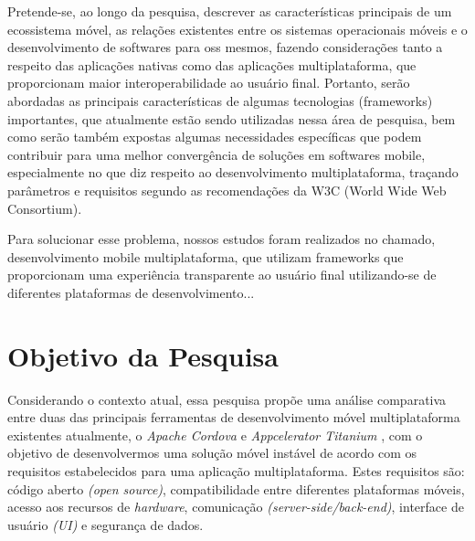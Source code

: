 Pretende-se, ao longo da pesquisa, descrever as características principais de um ecossistema móvel, as
relações existentes entre os sistemas operacionais móveis e o desenvolvimento de softwares para oss
mesmos, fazendo considerações tanto a respeito das aplicações nativas como das aplicações
multiplataforma, que proporcionam maior interoperabilidade ao usuário final. Portanto, serão abordadas as
principais características de algumas tecnologias (frameworks) importantes, que atualmente estão sendo
utilizadas nessa área de pesquisa, bem como serão também expostas algumas necessidades específicas que
podem contribuir para uma melhor convergência de soluções em softwares mobile, especialmente no que diz
respeito ao desenvolvimento multiplataforma, traçando parâmetros e requisitos segundo as recomendações
da W3C (World Wide Web Consortium).

Para solucionar esse problema, nossos estudos foram realizados no
chamado, desenvolvimento mobile multiplataforma, que utilizam frameworks que
proporcionam uma experiência transparente ao usuário final utilizando-se de
diferentes plataformas de desenvolvimento...


\section{Objetivo da Pesquisa} %
\label{sec:objetivos}
Considerando o contexto atual, essa pesquisa propõe uma análise comparativa
entre duas das principais ferramentas de desenvolvimento móvel multiplataforma
existentes atualmente, o \textit{Apache Cordova}
\textsuperscript{\texttrademark} e \textit{Appcelerator Titanium}
\textsuperscript{\texttrademark}, com o objetivo de desenvolvermos uma solução
móvel instável de acordo com os requisitos estabelecidos para uma aplicação
multiplataforma. Estes requisitos são: código aberto \textit{(open source)},
compatibilidade entre diferentes plataformas móveis, acesso aos recursos de
\textit{hardware}, comunicação \textit{(server-side/back-end)}, interface de
usuário \textit{(UI)} e segurança de dados.


